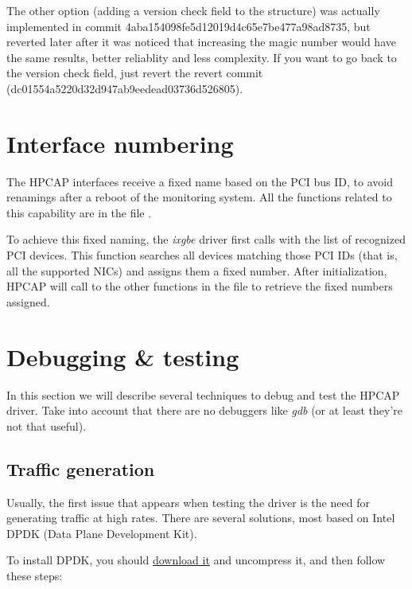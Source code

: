 \documentclass[oneside]{hpman}
\begin{document}
The other option (adding a version check field to the structure) was actually implemented in commit 4aba154098fe5d12019d4c65e7be477a98ad8735, but reverted later after it was noticed that increasing the magic number would have the same results, better reliablity and less complexity. If you want to go back to the version check field, just revert the revert commit (dc01554a5220d32d947ab9eedead03736d526805).

\section{Interface numbering}
\label{sec:IfaceNumber}

The HPCAP interfaces receive a fixed name based on the PCI bus ID, to avoid renamings after a reboot of the monitoring system. All the functions related to this capability are in the file .

To achieve this fixed naming, the \textit{ixgbe} driver first calls  with the list of recognized PCI devices. This function searches all devices matching those PCI IDs (that is, all the supported NICs) and assigns them a fixed number. After initialization, HPCAP will call to the other functions in the file to retrieve the fixed numbers assigned.


\section{Debugging \& testing}

In this section we will describe several techniques to debug and test the HPCAP driver. Take into account that there are no debuggers like \textit{gdb} (or at least they're not that useful).

\subsection{Traffic generation}

Usually, the first issue that appears when testing the driver is the need for generating traffic at high rates. There are several solutions, most based on Intel DPDK (Data Plane Development Kit).

To install DPDK, you should \href{http://dpdk.org/download}{download it} and uncompress it, and then follow these steps:
\end{document}

